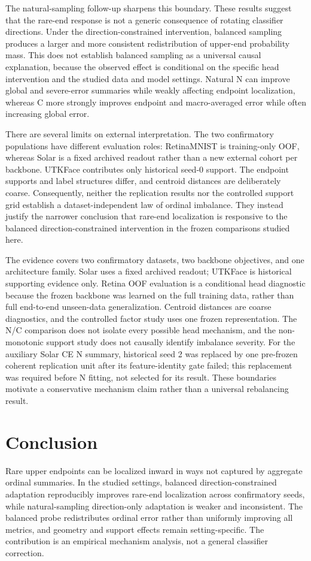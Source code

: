 The natural-sampling follow-up sharpens this boundary. These results suggest that the rare-end response is not a generic consequence of rotating classifier directions. Under the direction-constrained intervention, balanced sampling produces a larger and more consistent redistribution of upper-end probability mass. This does not establish balanced sampling as a universal causal explanation, because the observed effect is conditional on the specific head intervention and the studied data and model settings. Natural N can improve global and severe-error summaries while weakly affecting endpoint localization, whereas C more strongly improves endpoint and macro-averaged error while often increasing global error.

There are several limits on external interpretation. The two confirmatory populations have different evaluation roles: RetinaMNIST is training-only OOF, whereas Solar is a fixed archived readout rather than a new external cohort per backbone. UTKFace contributes only historical seed-0 support. The endpoint supports and label structures differ, and centroid distances are deliberately coarse. Consequently, neither the replication results nor the controlled support grid establish a dataset-independent law of ordinal imbalance. They instead justify the narrower conclusion that rare-end localization is responsive to the balanced direction-constrained intervention in the frozen comparisons studied here.

The evidence covers two confirmatory datasets, two backbone objectives, and one architecture family. Solar uses a fixed archived readout; UTKFace is historical supporting evidence only. Retina OOF evaluation is a conditional head diagnostic because the frozen backbone was learned on the full training data, rather than full end-to-end unseen-data generalization. Centroid distances are coarse diagnostics, and the controlled factor study uses one frozen representation. The N/C comparison does not isolate every possible head mechanism, and the non-monotonic support study does not causally identify imbalance severity. For the auxiliary Solar CE N summary, historical seed 2 was replaced by one pre-frozen coherent replication unit after its feature-identity gate failed; this replacement was required before N fitting, not selected for its result. These boundaries motivate a conservative mechanism claim rather than a universal rebalancing result.

\section{Conclusion}
Rare upper endpoints can be localized inward in ways not captured by aggregate ordinal summaries. In the studied settings, balanced direction-constrained adaptation reproducibly improves rare-end localization across confirmatory seeds, while natural-sampling direction-only adaptation is weaker and inconsistent. The balanced probe redistributes ordinal error rather than uniformly improving all metrics, and geometry and support effects remain setting-specific. The contribution is an empirical mechanism analysis, not a general classifier correction.
